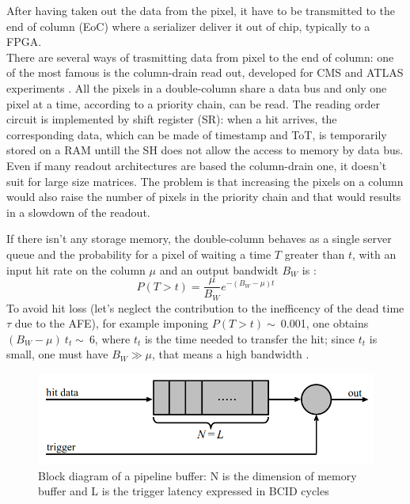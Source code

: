    After having taken out the data from the pixel, it have to be transmitted to the end of column (EoC) where a serializer deliver it out of chip, typically to a FPGA.\\ 
   There are several ways of trasmitting data from pixel to the end of column: one of the most famous is the column-drain read out, developed for CMS and ATLAS experiments \cite{column-drain}. 
   All the pixels in a double-column share a data bus and only one pixel at a time, according to a priority chain, can be read. The reading order circuit is implemented by shift register (SR): when a hit arrives, the corresponding data, which can be made of timestamp and ToT, is temporarily stored on a RAM untill the SH does not allow the access to memory by data bus. \\
   Even if many readout architectures are based the column-drain one, it doesn't suit for large size matrices. The problem is that increasing the pixels on a column would also raise the number of pixels in the priority chain and that would results in a slowdown of the readout. 

   If there isn't any storage memory, the double-column behaves as a single server queue and the probability for a pixel of waiting a time $T$ greater than $t$, with an input hit rate on the column $\mu$ and an output bandwidt $B_W$ is \cite{Garcia-Review}:
   \begin{equation}
   P(T > t) = \frac{\mu}{B_W} e^{-( B_W-\mu )t}
   \label{eq:priority_chain_no_buffer}
   \end{equation}
   To avoid hit loss (let's neglect the contribution to the inefficency of the dead time $\tau$ due to the AFE), for example imponing $P(T > t)\sim\:$0.001, one obtains $(B_W -\mu)\:t_t\sim\:$6, where $t_t$ is the time needed to transfer the hit; since $t_t$ is small, one must have $B_W \gg \mu$, that means a high bandwidth \cite{Garcia-Review}.
   \begin{figure}[h!]
      \centering
      \includegraphics[width=.6\linewidth]{figures/Pixel_detectors/pipeline.png}
      \caption{Block diagram of a pipeline buffer: N is the dimension of memory buffer and L is the trigger latency expressed in BCID cycles}
      \label{fig:pipeline}
   \end{figure}

